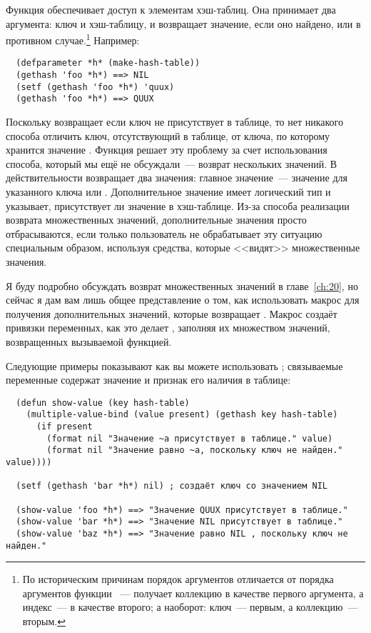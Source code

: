 Функция  обеспечивает доступ к элементам хэш-таблиц.  Она принимает два
аргумента: ключ и хэш-таблицу, и возвращает значение, если оно найдено, или  в
противном случае.\footnote{По историческим причинам порядок аргументов 
  отличается от порядка аргументов функции ~---  получает коллекцию в
  качестве первого аргумента, а индекс~--- в качестве второго; а  наоборот:
  ключ~--- первым, а коллекцию~--- вторым.}  Например:

\begin{verbatim}
  (defparameter *h* (make-hash-table))
  (gethash 'foo *h*) ==> NIL
  (setf (gethash 'foo *h*) 'quux)
  (gethash 'foo *h*) ==> QUUX
\end{verbatim}

Поскольку  возвращает  если ключ не присутствует в таблице, то нет
никакого способа отличить ключ, отсутствующий в таблице, от ключа, по которому хранится
значение .  Функция  решает эту проблему за счет использования
способа, который мы ещё не обсуждали~--- возврат нескольких значений.  В действительности
 возвращает два значения: главное значение~--- значение для указанного ключа
или .  Дополнительное значение имеет логический тип и указывает, присутствует ли
значение в хэш-таблице.  Из-за способа реализации возврата множественных значений,
дополнительные значения просто отбрасываются, если только пользователь не обрабатывает эту
ситуацию специальным образом, используя средства, которые <<видят>> множественные значения.

Я буду подробно обсуждать возврат множественных значений в главе~\ref{ch:20}, но сейчас я
дам вам лишь общее представление о том, как использовать макрос 
для получения дополнительных значений, которые возвращает .  Макрос
 создаёт привязки переменных, как это делает ,
заполняя их множеством значений, возвращенных вызываемой функцией.

Следующие примеры показывают как вы можете использовать ;
связываемые переменные содержат значение и признак его наличия в таблице:

\begin{lstlisting}  
  (defun show-value (key hash-table)
    (multiple-value-bind (value present) (gethash key hash-table)
      (if present
        (format nil "Значение ~a присутствует в таблице." value)
        (format nil "Значение равно ~a, поскольку ключ не найден." value))))

  (setf (gethash 'bar *h*) nil) ; создаёт ключ со значением NIL

  (show-value 'foo *h*) ==> "Значение QUUX присутствует в таблице."
  (show-value 'bar *h*) ==> "Значение NIL присутствует в таблице."
  (show-value 'baz *h*) ==> "Значение равно NIL , поскольку ключ не найден."
\end{lstlisting}

